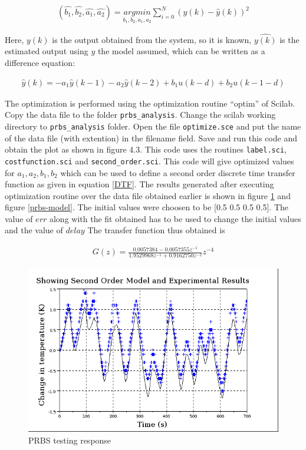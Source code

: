 \begin{align}
(\hat{b_1}, \hat{b_2}, \hat{a_1}, \hat{a_2})=\underset{b_1, b_2, a_1, a_2}{argmin}\sum_{i=0}^{N}(y(k)-\hat{y}(k))^{2}
\end{align}


Here, $y(k)$ is the output obtained from the system, so it is known, $\hat{y(k)}$ is the estimated output using $y$ the model assumed, which can be written as a difference equation:

\begin{align}
\hat{y}(k) = -a_1\hat{y}(k - 1) - a_2\hat{y}(k - 2) + b_1 u(k - d) + b_2 u(k - 1 - d)
\end{align}

The optimization is performed using the optimization routine “optim” of Scilab. Copy the  data file to the folder {\tt prbs\_analysis}. Change the scilab working directory to {\tt prbs\_analysis} folder. Open the file {\tt optimize.sce} and put the name of the data file (with extention) in the filename field. Save and run this code and obtain the plot as shown in figure 4.3. This code uses the routines {\tt label.sci}, {\tt costfunction.sci} and {\tt second\_order.sci}. This code will give optimized values for $a_1, a_2, b_1, b_2$ which can be used to define a second order discrete time transfer function as given in equation \ref{DTF}. The results generated after executing optimization routine over the data file obtained earlier is shown in figure \ref{prbs-fit} and figure \ref{prbs-model}. The initial values were choosen to be [0.5 0.5 0.5 0.5]. The value of $err$ along with the fit obtained has to be used to change the initial values and the value of $delay$ The transfer function thus obtained is 

\begin{align}\label{model}
G(z)=\frac{0.0057384 - 0.0057355 z^{-1}}{1.9529968z^{-1}+0.9162750z^{-2}}z^{-4}
\end{align}



\begin{figure}
\centering
\includegraphics[width=0.7\linewidth]{prbs/prbs-fit.png}
\caption{PRBS testing response}
\label{prbs-fit}
\end{figure}

